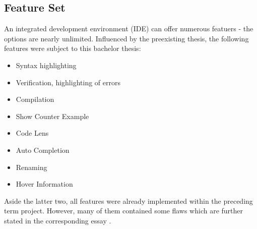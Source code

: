 \subsection{Feature Set}
An integrated development environment (IDE) can offer numerous featuers - the options are nearly unlimited. Influenced by the preexisting thesis, the following features were subject to this bachelor thesis:
\begin{itemize}
    \item Syntax highlighting
    \item Verification, highlighting of errors
    \item Compilation
    \item Show Counter Example
    \item Code Lens
    \item Auto Completion
    \item Renaming
    \item Hover Information
\end{itemize}

Aside the latter two, all features were already implemented within the preceding term project. However, many of them contained some flaws which are further stated in the corresponding essay \cite{sa}.


